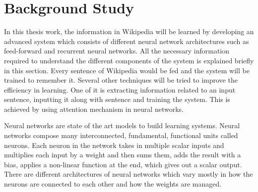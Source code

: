 \documentclass[a4paper, 11pt]{article}
\begin{document}

  





\section{Background Study}

In this thesis work, the information in Wikipedia will be learned by developing an advanced system which consists of different neural network architectures such as feed-forward and recurrent neural networks. All the necessary information required to understand the different components of the system is explained briefly in this section. Every sentence of Wikipedia would be fed and the system will be trained to remember it. Several other techniques will be tried to improve the efficiency in learning. One of it is extracting information related to an input sentence, inputting it along with sentence and training the system. This is achieved by using attention mechanism in neural networks.

Neural networks are state of the art models to build learning systems. Neural networks compose many interconnected, fundamental, functional units called neurons. Each neuron in the network takes in multiple scalar inputs and multiplies each input by a weight and then sums them, adds the result with a bias, applies a non-linear function at the end, which gives out a scalar output. There are different architectures of neural networks which vary mostly in how the neurons are connected to each other and how the weights are managed. 
\end{document}
